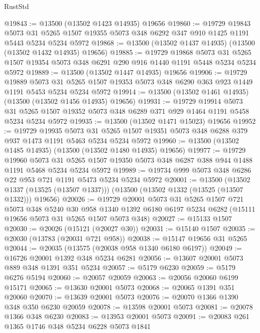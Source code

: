 \begin{lexlean}{RustStd}
\begin{coremodule}
@19843 := @13500 (@13502 @1423 @14935) @19656
@19860 := @19729
    @19843
    @5073
    @31
    @5265
    @1507
    @19355
    @5073
    @348
    @6292
    @347
    @910
    @1425
    @1191
    @5443
    @5234
    @5234
    @5972
@19868 := @13500 (@13502 @1437 @14935) (@13500 (@13502 @1432 @14935) @19656)
@19885 := @19729
    @19868
    @5073
    @31
    @5265
    @1507
    @19354
    @5073
    @348
    @6291
    @290
    @916
    @1440
    @1191
    @5448
    @5234
    @5234
    @5972
@19889 := @13500 (@13502 @1447 @14935) @19656
@19906 := @19729
    @19889
    @5073
    @31
    @5265
    @1507
    @19353
    @5073
    @348
    @6290
    @363
    @923
    @1449
    @1191
    @5453
    @5234
    @5234
    @5972
@19914 := @13500 (@13502 @1461 @14935) (@13500 (@13502 @1456 @14935) @19656)
@19931 := @19729
    @19914
    @5073
    @31
    @5265
    @1507
    @19352
    @5073
    @348
    @6289
    @371
    @929
    @1464
    @1191
    @5458
    @5234
    @5234
    @5972
@19935 := @13500 (@13502 @1471 @15023) @19656
@19952 := @19729
    @19935
    @5073
    @31
    @5265
    @1507
    @19351
    @5073
    @348
    @6288
    @379
    @937
    @1473
    @1191
    @5463
    @5234
    @5234
    @5972
@19960 := @13500 (@13502 @1485 @14935) (@13500 (@13502 @1480 @14935) @19656)
@19977 := @19729
    @19960
    @5073
    @31
    @5265
    @1507
    @19350
    @5073
    @348
    @6287
    @388
    @944
    @1488
    @1191
    @5468
    @5234
    @5234
    @5972
@19989 := @19734 @999 @5073 @348 @6286 @22 @953 @721 @1191 @5473 @5234 @5234 @5972
@20001 := @13500
    (@13502 @1337 (@13525 (@13507 @1337)))
    (@13500 (@13502 @1332 (@13525 (@13507 @1332))) @19656)
@20026 := @19729
    @20001
    @5073
    @31
    @5265
    @1507
    @721
    @5073
    @348
    @5240
    @30
    @958
    @1340
    @1392
    @6180
    @6197
    @5234
    @6282
    (@15111 @19656 @5073 @31 @5265 @1507 @5073 @348)
@20027 := @15133 @1507
@20030 := @20026 (@15121 (@20027 @30))
@20031 := @15140 @1507
@20035 := @20030 (@13783 (@20031 @721 @958))
@20038 := @15147 @19656 @31 @5265
@20044 := @20035 (@13575 (@20038 @958 @1340 @6180 @6197))
@20049 := @16726 @20001 @1392 @348 @5234 @6281
@20056 := @13607 @20001 @5073 @889 @348 @1391 @351 @5234
@20057 := @5179 @6230
@20059 := @5179 @6276 @5194
@20060 := @20057 @20059
@20063 := @20056 @20060 @6199 @15171
@20065 := @13630 @20001 @5073
@20068 := @20065 @1391 @351 @20060
@20070 := @13639 @20001 @5073
@20076 := @20070 @1366 @1390 @348 @350 @6230 @20059
@20078 := @13598 @20001 @5073
@20081 := @20078 @1366 @348 @6230
@20083 := @13953 @20001 @5073
@20091 := @20083 @261 @1365 @1746 @348 @5234 @6228 @5073 @1841

\end{coremodule}
\end{lexlean}
